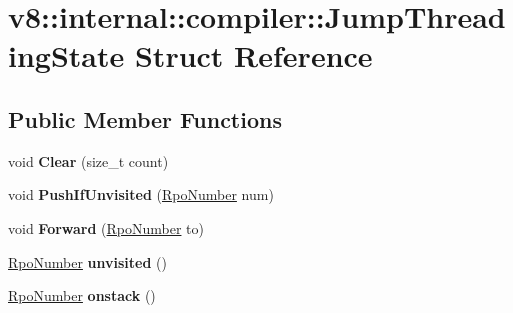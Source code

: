 \hypertarget{structv8_1_1internal_1_1compiler_1_1_jump_threading_state}{}\section{v8\+:\+:internal\+:\+:compiler\+:\+:Jump\+Threading\+State Struct Reference}
\label{structv8_1_1internal_1_1compiler_1_1_jump_threading_state}
\subsection*{Public Member Functions}
\begin{DoxyCompactItemize}
\item 
void {\bfseries Clear} (size\+\_\+t count)\hypertarget{structv8_1_1internal_1_1compiler_1_1_jump_threading_state_a4b08f4f2e40dd532dd5cdfedcf1dad38}{}\label{structv8_1_1internal_1_1compiler_1_1_jump_threading_state_a4b08f4f2e40dd532dd5cdfedcf1dad38}

\item 
void {\bfseries Push\+If\+Unvisited} (\hyperlink{classv8_1_1internal_1_1compiler_1_1_rpo_number}{Rpo\+Number} num)\hypertarget{structv8_1_1internal_1_1compiler_1_1_jump_threading_state_a4dad8cc6070fcf9c8d1d8f613828ddde}{}\label{structv8_1_1internal_1_1compiler_1_1_jump_threading_state_a4dad8cc6070fcf9c8d1d8f613828ddde}

\item 
void {\bfseries Forward} (\hyperlink{classv8_1_1internal_1_1compiler_1_1_rpo_number}{Rpo\+Number} to)\hypertarget{structv8_1_1internal_1_1compiler_1_1_jump_threading_state_a46c484de071bc8c3f7a2fa04d74aa306}{}\label{structv8_1_1internal_1_1compiler_1_1_jump_threading_state_a46c484de071bc8c3f7a2fa04d74aa306}

\item 
\hyperlink{classv8_1_1internal_1_1compiler_1_1_rpo_number}{Rpo\+Number} {\bfseries unvisited} ()\hypertarget{structv8_1_1internal_1_1compiler_1_1_jump_threading_state_ad03caa50cb24e9cfca8ce585acf2d106}{}\label{structv8_1_1internal_1_1compiler_1_1_jump_threading_state_ad03caa50cb24e9cfca8ce585acf2d106}

\item 
\hyperlink{classv8_1_1internal_1_1compiler_1_1_rpo_number}{Rpo\+Number} {\bfseries onstack} ()\hypertarget{structv8_1_1internal_1_1compiler_1_1_jump_threading_state_a19a1ce3f335e579b677d280be1626957}{}\label{structv8_1_1internal_1_1compiler_1_1_jump_threading_state_a19a1ce3f335e579b677d280be1626957}

\end{DoxyCompactItemize}
